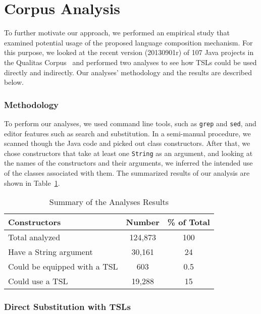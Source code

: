 \section{Corpus Analysis}
\label{s:study}

To further motivate our approach, we performed an empirical study that examined potential usage of the proposed language composition mechanism. For this purpose, we looked at the recent version (20130901r) of 107 Java projects in the Qualitas Corpus~\cite{QualitasCorpus:APSEC:2010} and performed two analyses to see how TSLs could be used directly and indirectly. Our analyses' methodology and the results are described below.

\subsubsection{Methodology}

To perform our analyses, we used command line tools, such as \lstinline{grep} and \lstinline{sed}, and editor features such as search and substitution. In a semi-manual procedure, we scanned though the Java code and picked out class constructors. After that, we chose constructors that take at least one \lstinline{String} as an argument, and looking at the names of the constructors and their arguments, we inferred the intended use of the classes associated with them. The summarized results of our analysis are shown in Table~\ref{t-summary}.

\begin{table}
   \centering
    \begin{tabular}{l | c | c}
    \bf Constructors & \bf Number & \bf \% of Total \\ \hline
    Total analyzed & 124,873 & 100 \\
    Have a String argument & 30,161 & 24 \\
    Could be equipped with a TSL & 603 & 0.5 \\
    Could use a TSL & 19,288 & 15 \\
    \end{tabular}
    \vspace{0.15in}
    \caption{Summary of the Analyses Results}
    \label{t-summary}
\end{table}

\subsubsection{Direct Substitution with TSLs}

